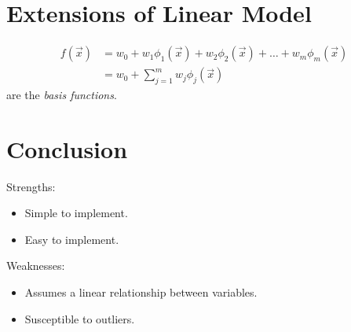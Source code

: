 \documentclass[
	number={5},
	title={Linear Regression}
]{cs584notes}
\begin{document}
\section{Extensions of Linear Model}\label{sec:extensions-of-linear-model}
\begin{equation*}
\begin{aligned}
	f(\vec{x}) &= w_{0} + w_{1}\phi_{1}(\vec{x}) + w_{2}\phi_{2}(\vec{x}) + \dots + w_{m}\phi_{m}(\vec{x})\\
			   &= w_{0} + \sum_{j=1}^{m} w_{j}\phi_{j}(\vec{x})
\end{aligned}
\end{equation*}
 are the \emph{basis functions}.


\section{Conclusion}\label{sec:conclusion-5}
Strengths:
\begin{itemize}
	\item Simple to implement.
	\item Easy to implement.
\end{itemize}

Weaknesses:
\begin{itemize}
	\item Assumes a linear relationship between variables.
	\item Susceptible to outliers.
\end{itemize}
\end{document}
